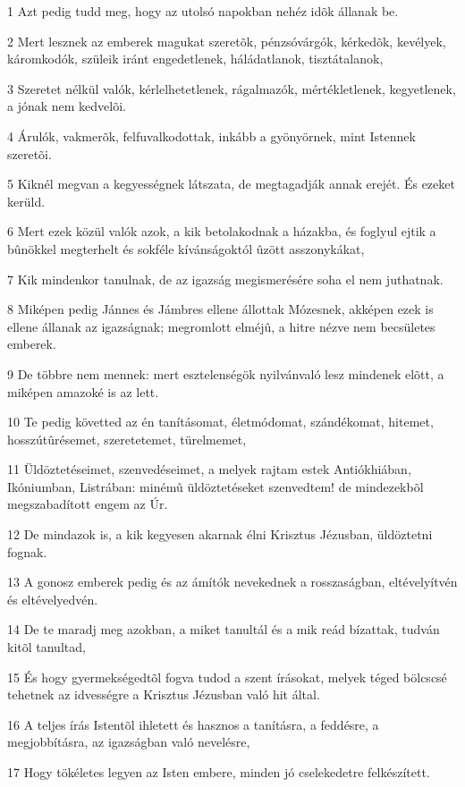 \par 1 Azt pedig tudd meg, hogy az utolsó napokban nehéz idõk állanak be.
\par 2 Mert lesznek az emberek magukat szeretõk, pénzsóvárgók, kérkedõk, kevélyek, káromkodók, szüleik iránt engedetlenek, háládatlanok, tisztátalanok,
\par 3 Szeretet nélkül valók, kérlelhetetlenek, rágalmazók, mértékletlenek, kegyetlenek, a jónak nem kedvelõi.
\par 4 Árulók, vakmerõk, felfuvalkodottak, inkább a gyönyörnek, mint Istennek szeretõi.
\par 5 Kiknél megvan a kegyességnek látszata, de megtagadják annak erejét. És ezeket kerüld.
\par 6 Mert ezek közül valók azok, a kik betolakodnak a házakba, és foglyul ejtik a bûnökkel megterhelt és sokféle kívánságoktól ûzött asszonykákat,
\par 7 Kik mindenkor tanulnak, de az igazság megismerésére soha el nem juthatnak.
\par 8 Miképen pedig Jánnes és Jámbres ellene állottak Mózesnek, akképen ezek is ellene állanak az igazságnak; megromlott elméjû, a hitre nézve nem becsületes emberek.
\par 9 De többre nem mennek: mert esztelenségök nyilvánvaló lesz mindenek elõtt, a miképen amazoké is az lett.
\par 10 Te pedig követted az én tanításomat, életmódomat, szándékomat, hitemet, hosszútûrésemet, szeretetemet, türelmemet,
\par 11 Üldöztetéseimet, szenvedéseimet, a melyek rajtam estek Antiókhiában, Ikóniumban, Listrában: minémû üldöztetéseket szenvedtem! de mindezekbõl megszabadított engem az Úr.
\par 12 De mindazok is, a kik kegyesen akarnak élni Krisztus Jézusban, üldöztetni fognak.
\par 13 A gonosz emberek pedig és az ámítók nevekednek a rosszaságban, eltévelyítvén és eltévelyedvén.
\par 14 De te maradj meg azokban, a miket tanultál és a mik reád bízattak, tudván kitõl tanultad,
\par 15 És hogy gyermekségedtõl fogva tudod a szent írásokat, melyek téged bölcscsé tehetnek az idvességre a Krisztus Jézusban való hit által.
\par 16 A teljes írás Istentõl ihletett és hasznos a tanításra, a feddésre, a megjobbításra, az igazságban való nevelésre,
\par 17 Hogy tökéletes legyen az Isten embere, minden jó cselekedetre felkészített.

